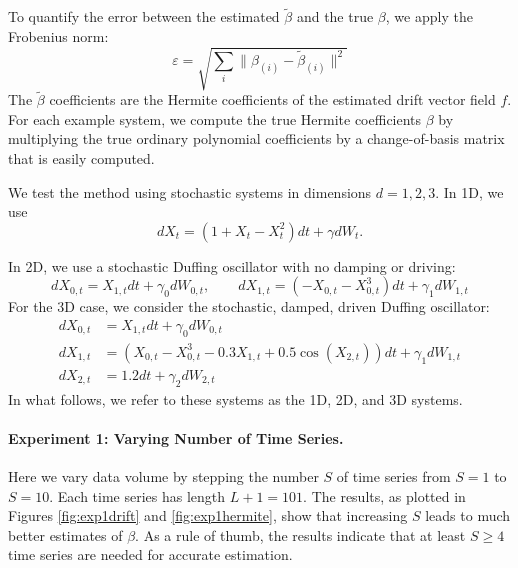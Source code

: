 \documentclass{article}
\begin{document}
To quantify the error between the estimated $\widetilde{\beta}$ and the true $\beta$, we apply the Frobenius norm:
\begin{equation}
\label{eqn:frob}
\varepsilon = \sqrt{\sum_i \| \beta_{(i)} - \widetilde{\beta}_{(i)} \|^2 }
\end{equation}
The $\widetilde{\beta}$ coefficients are the Hermite coefficients of the estimated drift vector field $f$.  For each example system, we compute the true Hermite coefficients $\beta$ by multiplying the true ordinary polynomial coefficients by a change-of-basis matrix that is easily computed.

We test the method using stochastic systems in dimensions $d= 1, 2, 3$.  In 1D, we use
\begin{equation*}
dX_t = (1 + X_t - X_t^2 ) dt + \gamma dW_t.
\end{equation*}

In 2D, we use a stochastic Duffing oscillator with no damping or driving:
\begin{equation*}
dX_{0,t} = X_{1,t} dt + \gamma_0 dW_{0,t}, \qquad
dX_{1,t} = (-X_{0,t} - X^3_{0,t}) dt + \gamma_1 dW_{1,t}
\end{equation*}
For the 3D case, we consider the stochastic, damped, driven Duffing oscillator:
\begin{align*}
dX_{0,t} & = X_{1,t} dt + \gamma_0 dW_{0,t} \\
dX_{1,t} & = (X_{0,t} - X_{0,t}^3 - 0.3 X_{1,t} + 0.5 \cos (X_{2,t})) dt + \gamma_1 dW_{1,t} \\
dX_{2,t} & = 1.2 dt + \gamma_2 dW_{2,t}
\end{align*}
In what follows, we refer to these systems as the 1D, 2D, and 3D systems.

\paragraph{Experiment 1: Varying Number of Time Series.} Here we vary data volume by stepping the number $S$ of time series from $S=1$ to $S=10$.  Each time series has length $L+1 = 101$.  The results, as plotted in Figures \ref{fig:exp1drift} and \ref{fig:exp1hermite}, show that increasing $S$ leads to much better estimates of $\beta$.  As a rule of thumb, the results indicate that at least $S \geq 4$ time series are needed for accurate estimation.
\end{document}
